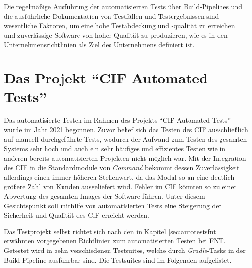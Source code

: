 Die regelmäßige Ausführung der automatisierten Tests über Build-Pipelines und die ausführliche Dokumentation von Testfällen und Testergebnissen sind wesentliche Faktoren, um eine hohe Testabdeckung und -qualität zu erreichen und zuverlässige Software von hoher Qualität zu produzieren, wie es in den Unternehmensrichtlinien als Ziel des Unternehmens definiert ist. \cite{fnt:2020}

\section{Das Projekt \enquote{CIF Automated Tests}}\label{sec:ciftestprojekt}
Das automatisierte Testen im Rahmen des Projekts \enquote{CIF Automated Tests} wurde im Jahr 2021 begonnen. Zuvor belief sich das Testen des \ac{CIF} ausschließlich auf manuell durchgeführte Tests, wodurch der Aufwand zum Testen des gesamten Systems sehr hoch und auch ein sehr häufiges und effizientes Testen wie in anderen bereits automatisierten Projekten nicht möglich war. Mit der Integration des \ac{CIF} in die Standardmodule von \textit{Command} bekommt dessen Zuverlässigkeit allerdings einen immer höheren Stellenwert, da das Modul so an eine deutlich größere Zahl von Kunden ausgeliefert wird. Fehler im \ac{CIF} könnten so zu einer Abwertung des gesamten Images der Software führen. Unter diesem Gesichtspunkt soll mithilfe von automatisierten Tests eine Steigerung der Sicherheit und Qualität des \ac{CIF} erreicht werden.

Das Testprojekt selbst richtet sich nach den in Kapitel \ref{sec:autotestsfnt} erwähnten vorgegebenen Richtlinien zum automatisierten Testen bei FNT. Getestet wird in zehn verschiedenen Testsuites, welche durch \textit{Gradle}-Tasks in der Build-Pipeline ausführbar sind. Die Testsuites sind im Folgenden aufgelistet. 


